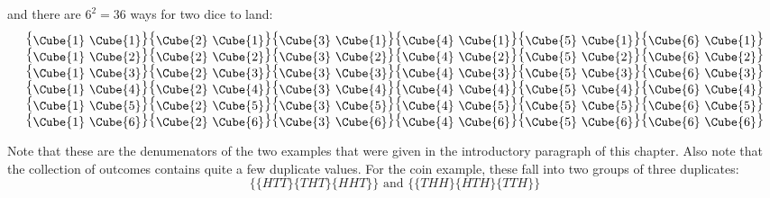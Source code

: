 \noindent and there are $6^2=36$ ways for two dice to land:
\[
\begin{array}{c}
\mbox{ \big\{\raisebox{-2pt}{\Cube{1}
    \Cube{1}}\big\}\big\{\raisebox{-2pt}{\Cube{2}
    \Cube{1}}\big\}\big\{\raisebox{-2pt}{\Cube{3}
    \Cube{1}}\big\}\big\{\raisebox{-2pt}{\Cube{4}
    \Cube{1}}\big\}\big\{\raisebox{-2pt}{\Cube{5}
    \Cube{1}}\big\}\big\{\raisebox{-2pt}{\Cube{6} \Cube{1}}\big\}
}\\ \mbox{ \big\{\raisebox{-2pt}{\Cube{1}
    \Cube{2}}\big\}\big\{\raisebox{-2pt}{\Cube{2}
    \Cube{2}}\big\}\big\{\raisebox{-2pt}{\Cube{3}
    \Cube{2}}\big\}\big\{\raisebox{-2pt}{\Cube{4}
    \Cube{2}}\big\}\big\{\raisebox{-2pt}{\Cube{5}
    \Cube{2}}\big\}\big\{\raisebox{-2pt}{\Cube{6} \Cube{2}}\big\}
}\\ \mbox{ \big\{\raisebox{-2pt}{\Cube{1}
    \Cube{3}}\big\}\big\{\raisebox{-2pt}{\Cube{2}
    \Cube{3}}\big\}\big\{\raisebox{-2pt}{\Cube{3}
    \Cube{3}}\big\}\big\{\raisebox{-2pt}{\Cube{4}
    \Cube{3}}\big\}\big\{\raisebox{-2pt}{\Cube{5}
    \Cube{3}}\big\}\big\{\raisebox{-2pt}{\Cube{6} \Cube{3}}\big\}
}\\ \mbox{ \big\{\raisebox{-2pt}{\Cube{1}
    \Cube{4}}\big\}\big\{\raisebox{-2pt}{\Cube{2}
    \Cube{4}}\big\}\big\{\raisebox{-2pt}{\Cube{3}
    \Cube{4}}\big\}\big\{\raisebox{-2pt}{\Cube{4}
    \Cube{4}}\big\}\big\{\raisebox{-2pt}{\Cube{5}
    \Cube{4}}\big\}\big\{\raisebox{-2pt}{\Cube{6} \Cube{4}}\big\}
}\\ \mbox{ \big\{\raisebox{-2pt}{\Cube{1}
    \Cube{5}}\big\}\big\{\raisebox{-2pt}{\Cube{2}
    \Cube{5}}\big\}\big\{\raisebox{-2pt}{\Cube{3}
    \Cube{5}}\big\}\big\{\raisebox{-2pt}{\Cube{4}
    \Cube{5}}\big\}\big\{\raisebox{-2pt}{\Cube{5}
    \Cube{5}}\big\}\big\{\raisebox{-2pt}{\Cube{6} \Cube{5}}\big\}
}\\ \mbox{ \big\{\raisebox{-2pt}{\Cube{1}
    \Cube{6}}\big\}\big\{\raisebox{-2pt}{\Cube{2}
    \Cube{6}}\big\}\big\{\raisebox{-2pt}{\Cube{3}
    \Cube{6}}\big\}\big\{\raisebox{-2pt}{\Cube{4}
    \Cube{6}}\big\}\big\{\raisebox{-2pt}{\Cube{5}
    \Cube{6}}\big\}\big\{\raisebox{-2pt}{\Cube{6} \Cube{6}}\big\}
}
\end{array}\]
    
Note that these are the denumenators of the two examples that were
given in the introductory paragraph of this chapter. Also note that
the collection of outcomes contains quite a few duplicate values.  For
the coin example, these fall into two groups of three duplicates:
\[\{\{HTT\}\{THT\}\{HHT\}\} \mbox{~and~} \{\{THH\}\{HTH\}\{TTH\}\}\]

